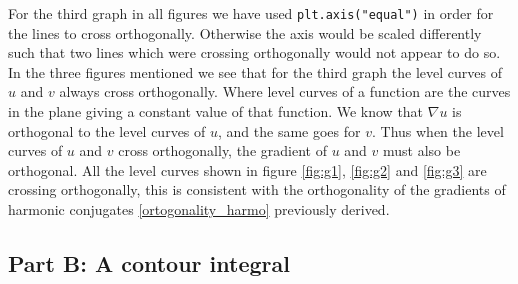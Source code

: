 \documentclass[12pt,twoside]{article}
\begin{document}
For the third graph in all figures we have used \texttt{plt.axis("equal")} in order for the lines to cross orthogonally. Otherwise the axis would be scaled differently such that two lines which were crossing orthogonally would not appear to do so. \\
In the three figures mentioned we see that for the third graph the level curves of $u$ and $v$ always cross orthogonally. Where level curves of a function are the curves in the plane giving a constant value of that function. We know that $\nabla u$ is orthogonal to the level curves of $u$, and the same goes for $v$. Thus when the level curves of $u$ and $v$ cross orthogonally, the gradient of $u$ and $v$ must also be orthogonal. All the level curves shown in figure \ref{fig:g1}, \ref{fig:g2} and \ref{fig:g3} are crossing orthogonally, this is consistent with the orthogonality of the gradients of harmonic conjugates \eqref{ortogonality_harmo} previously derived.

\subsection*{Part B: A contour integral}
\end{document}
